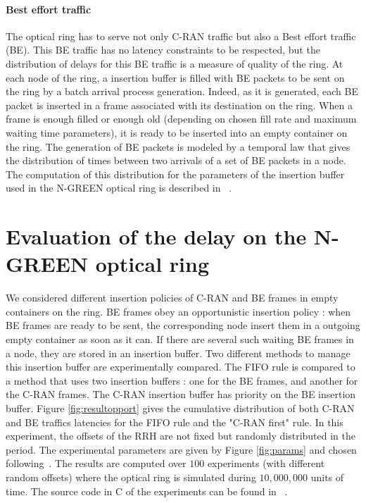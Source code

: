 \documentclass[10pt, conference, letterpaper]{IEEEtran}
\begin{document}
\paragraph{Best effort traffic}

The optical ring has to serve not only C-RAN traffic but also a Best effort traffic (BE).  This BE traffic has no latency constraints to be respected, but the  distribution of delays for this BE traffic is a measure of quality of the ring.  At each node of the ring, a insertion buffer is filled with BE packets to be sent on the ring by a batch arrival process generation. Indeed, as it is generated, each BE packet is inserted in a frame associated with its destination on the ring. When a frame is enough filled or enough old (depending on chosen fill rate and maximum waiting time parameters), it is ready to be inserted into an empty container on the ring.  The generation of BE packets is modeled by a temporal law that gives the distribution of times between two arrivals of a set  of BE packets in a node. The computation of this distribution for the parameters of the insertion buffer used in the N-GREEN optical ring is described in ~\cite{youssef2018}.

   \section{Evaluation of the delay on the N-GREEN optical ring}
   \label{sec:oportmethods}
   We considered different insertion policies of C-RAN and BE frames in empty containers on the ring.   BE frames obey an opportunistic insertion policy :  when BE frames are ready to be sent, the corresponding node insert them in a outgoing  empty container as soon as it can. If there are several  such waiting BE frames in  a node,  they are stored in an insertion buffer. Two different methods to manage this insertion buffer are experimentally compared. The FIFO rule is compared to a method that uses two insertion buffers : one for the BE frames, and another for the C-RAN frames. The C-RAN insertion buffer has priority  on the BE insertion buffer.  Figure \ref{fig:resultopport} gives the cumulative distribution of both C-RAN and BE traffics latencies for the FIFO rule and the "C-RAN first" rule. In this experiment, the offsets of the RRH are not fixed but randomly distributed in the period. The experimental parameters are given by Figure \ref{fig:params} and chosen following~\cite{ngreenarchitecture}. The results are computed over $100$ experiments (with different random offsets) where the optical ring is simulated during $10,000,000$ units of time. The source code in C of the experiments can be found in ~\cite{webpage}.
\end{document}
